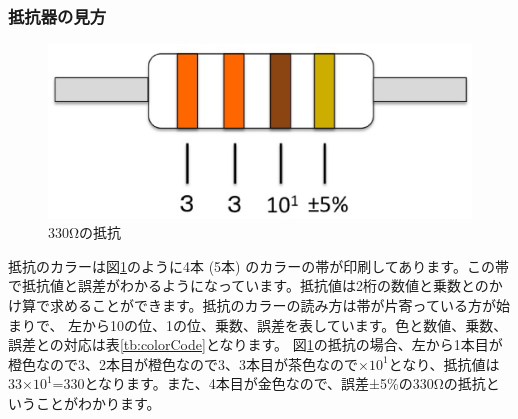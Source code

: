 \documentclass[11pt,a4paper]{jarticle}
\begin{document}
%

\subsubsection*{抵抗器の見方}

\begin{figure}[htb]
  \centering
  \includegraphics[width=0.5\columnwidth]{img/resistance.eps}
  \caption{330Ωの抵抗}
  \label{figure:resistance}
\end{figure}

抵抗のカラーは図\ref{figure:resistance}のように4本 (5本) のカラーの帯が印刷してあります。この帯で抵抗値と誤差がわかるようになっています。抵抗値は2桁の数値と乗数とのかけ算で求めることができます。抵抗のカラーの読み方は帯が片寄っている方が始まりで、
左から10の位、1の位、乗数、誤差を表しています。色と数値、乗数、誤差との対応は表\ref{tb:colorCode}となります。
図\ref{figure:resistance}の抵抗の場合、左から1本目が橙色なので3、2本目が橙色なので3、3本目が茶色なので$×10^1$となり、抵抗値は33×$10^1$=330となります。また、4本目が金色なので、誤差±5\%の330Ωの抵抗ということがわかります。
\end{document}
